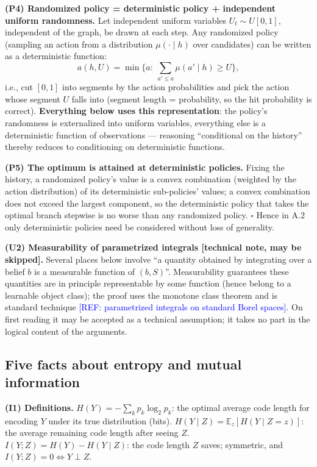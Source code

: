 \documentclass{article}
\newcommand{\refadd}[1]{\textcolor{blue}{[REF: #1]}}
\providecommand{\qed}{\hfill$\square$}
\begin{document}
\textbf{(P4) Randomized policy = deterministic policy + independent uniform randomness.} Let independent uniform variables $U_t\sim U[0,1]$, independent of the graph, be drawn at each step. Any randomized policy (sampling an action from a distribution $\mu(\cdot\mid h)$ over candidates) can be written as a deterministic function:
\[
a(h,U)=\min\Big\{a:\ \textstyle\sum_{a'\le a}\mu(a'\mid h)\ge U\Big\},
\]
i.e., cut $[0,1]$ into segments by the action probabilities and pick the action whose segment $U$ falls into (segment length = probability, so the hit probability is correct). \textbf{Everything below uses this representation}: the policy's randomness is externalized into uniform variables, everything else is a deterministic function of observations --- reasoning ``conditional on the history'' thereby reduces to conditioning on deterministic functions.

\textbf{(P5) The optimum is attained at deterministic policies.} Fixing the history, a randomized policy's value is a convex combination (weighted by the action distribution) of its deterministic sub-policies' values; a convex combination does not exceed the largest component, so the deterministic policy that takes the optimal branch stepwise is no worse than any randomized policy. \qed{} Hence in A.2 only deterministic policies need be considered without loss of generality.

\textbf{(U2) Measurability of parametrized integrals [technical note, may be skipped].} Several places below involve ``a quantity obtained by integrating over a belief $b$ is a measurable function of $(b,S)$''. Measurability guarantees these quantities are in principle representable by some function (hence belong to a learnable object class); the proof uses the monotone class theorem and is standard technique \refadd{parametrized integrals on standard Borel spaces}. On first reading it may be accepted as a technical assumption; it takes no part in the logical content of the arguments.

\subsection{Five facts about entropy and mutual information}

\textbf{(I1) Definitions.} $H(Y)=-\sum_k p_k\log_2 p_k$: the optimal average code length for encoding $Y$ under its true distribution (bits). $H(Y\mid Z)=\mathbb E_z[H(Y\mid Z{=}z)]$: the average remaining code length after seeing $Z$. $I(Y;Z)=H(Y)-H(Y\mid Z)$: the code length $Z$ saves; symmetric, and $I(Y;Z)=0\iff Y\perp Z$.
\end{document}
